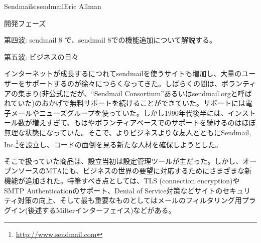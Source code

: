 \begin{aosachapter}{Sendmail}{s:sendmail}{Eric Allman}
\begin{aosasect1}{開発フェーズ}
\begin{aosasect2}{第四波: sendmail 8}
で、sendmail 8での機能追加について解説する。

\end{aosasect2}

\begin{aosasect2}{第五波: ビジネスの日々}

インターネットが成長するにつれてsendmailを使うサイトも増加し、大量のユーザーをサポートするのが徐々につらくなってきた。しばらくの間は、ボランティアの集まり(非公式にだが、``Sendmail Consortium''あるいはsendmail.orgと呼ばれていた)のおかげで無料サポートを続けることができていた。サポートには電子メールやニューズグループを使っていた。しかし1990年代後半には、インストール数が増えすぎて、もはやボランティアベースでのサポートを続けるのはほぼ無理な状態になっていた。そこで、よりビジネスよりな友人とともにSendmail, Inc.\footnote{\url{http://www.sendmail.com}}を設立し、コードの面倒を見る新たな人材を確保しようとした。

そこで扱っていた商品は、設立当初は設定管理ツールが主だった。しかし、オープンソースのMTAにも、ビジネスの世界の要望に対応するためにさまざまな新機能が追加された。特筆すべき点としては、TLS (connection encryption)やSMTP Authenticationのサポート、Denial of Service対策などサイトのセキュリティ対策の向上、そして最も重要なものとしてはメールのフィルタリング用プラグイン(後述するMilterインターフェイス)などがある。


\end{aosasect2}
\end{aosasect1}
\end{aosachapter}
